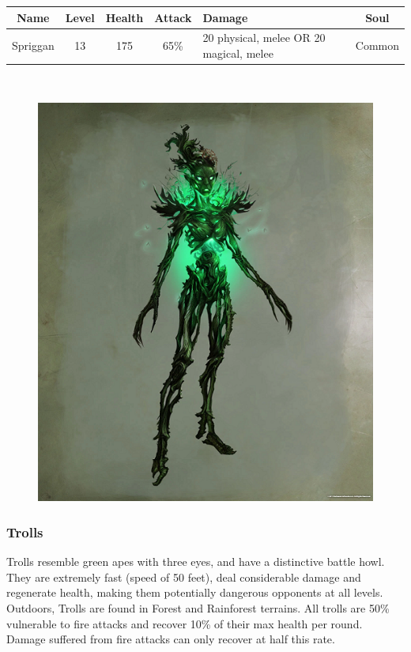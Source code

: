 \documentclass[12pt]{book}
\begin{document}
\begin{tabular}{|c|c|c|c|p{}|c|}
\hline
Name & Level & Health & Attack & Damage & Soul\\ \hline
Spriggan & 13 & 175 & 65\% & 20 physical, melee OR 20 magical, melee & Common\\ \hline
\end{tabular}\\

\begin{figure}[h]
	\centering
	\includegraphics[scale=0.8]{spriggan.png}
\end{figure}

\subsubsection{Trolls}
Trolls resemble green apes with three eyes, and have a distinctive battle howl. They are extremely fast (speed of 50 feet), deal considerable damage and regenerate health, making them potentially dangerous opponents at all levels. Outdoors, Trolls are found in Forest and Rainforest terrains. All trolls are 50\% vulnerable to fire attacks and recover 10\% of their max health per round. Damage suffered from fire attacks can only recover at half this rate.
\end{document}
